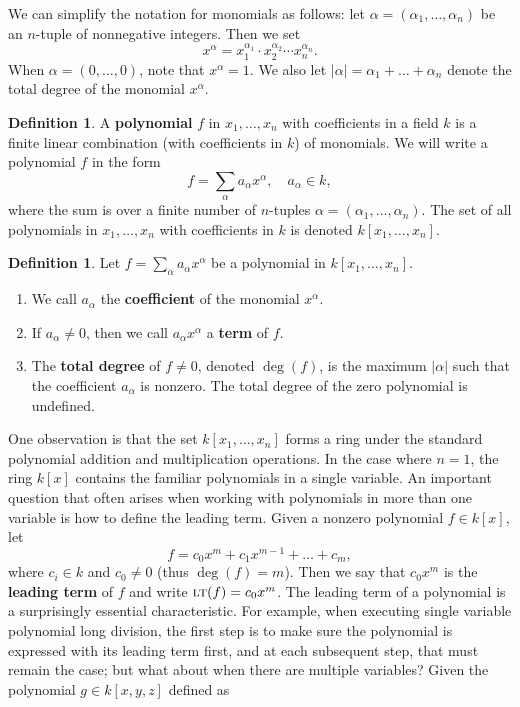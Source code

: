 \documentclass[MS, xcolor=dvipsnames]{wfuthesis}
\newcommand{\LT}{\ensuremath{\text{\sc lt}}}
\theoremstyle{definition}
\newtheorem{definition}[theorem]{Definition}
\begin{document}
We can simplify the notation for monomials as follows: let $\alpha = (\alpha_1,\dots,\alpha_n)$ be an $n$-tuple of nonnegative integers. Then we set
\[ x^\alpha = x_1^{\alpha_1} \cdot x_2^{\alpha_2} \cdots x_n^{\alpha_n}. \]
When $\alpha=(0,\dots,0)$, note that $x^\alpha=1$. We also let $|\alpha| = \alpha_1 + \dots + \alpha_n$ denote the total degree of the monomial $x^\alpha$.
\begin{definition}
  A \textbf{polynomial} $f$ in $x_1,\dots,x_n$ with coefficients in a field $k$ is a finite linear combination (with coefficients in $k$) of monomials. We will write a polynomial $f$ in the form
  \[ f = \sum_\alpha a_\alpha x^\alpha,\quad a_\alpha \in k, \]
  where the sum is over a finite number of $n$-tuples $\alpha = (\alpha_1,\dots,\alpha_n)$. The set of all polynomials in $x_1,\dots,x_n$ with coefficients in $k$ is denoted $k[x_1,\dots,x_n]$. 
\end{definition}
\begin{definition}
  Let $f = \sum_\alpha a_\alpha x^\alpha$ be a polynomial in $k[x_1,\dots,x_n]$. 
  \begin{enumerate}[label=(\roman*)]
    \item We call $a_\alpha$ the \textbf{coefficient} of the monomial $x^\alpha$. 
    \item If $a_\alpha\ne0$, then we call $a_\alpha x^\alpha$ a \textbf{term} of $f$. 
    \item The \textbf{total degree} of $f \ne 0$, denoted $\deg(f)$, is the maximum $|\alpha|$ such that the coefficient $a_\alpha$ is nonzero. The total degree of the zero polynomial is undefined.
  \end{enumerate}
\end{definition}
One observation is that the set $k[x_1,\dots,x_n]$ forms a ring under the standard polynomial addition and multiplication operations. In the case where $n=1$, the ring $k[x]$ contains the familiar polynomials in a single variable. An important question that often arises when working with polynomials in more than one variable is how to define the leading term. Given a nonzero polynomial $f \in k[x]$, let
\[ f = c_0x^m + c_1x^{m-1} + \dots + c_m, \]
where $c_i \in k$ and $c_0 \ne 0$ (thus $\deg(f)=m$). Then we say that $c_0x^m$ is the \textbf{leading term} of $f$ and write $\LT(f)=c_0x^m$. The leading term of a polynomial is a surprisingly essential characteristic. For example, when executing single variable polynomial long division, the first step is to make sure the polynomial is expressed with its leading term first, and at each subsequent step, that must remain the case; but what about when there are multiple variables? Given the polynomial $g \in k[x,y,z]$ defined as 
\end{document}
